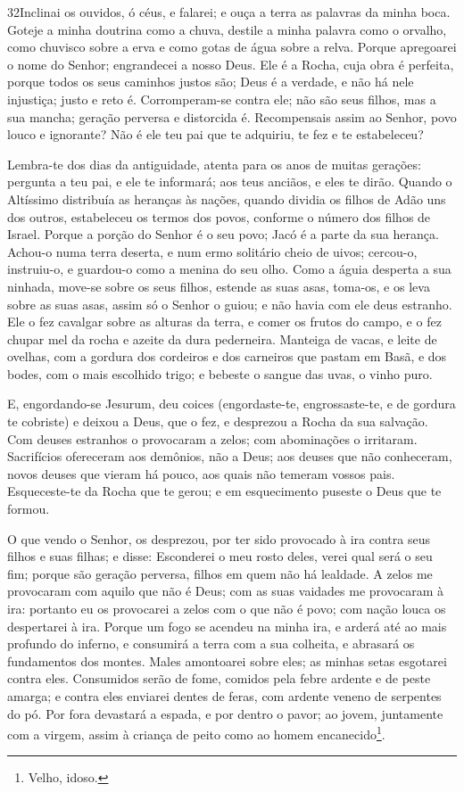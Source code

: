 \medskip

\lettrine{32} Inclinai os ouvidos, ó céus, e falarei; e ouça a
terra as palavras da minha boca. Goteje a minha doutrina como a
chuva, destile a minha palavra como o orvalho, como chuvisco sobre a
erva e como gotas de água sobre a relva. Porque apregoarei o
nome do Senhor; engrandecei a nosso Deus. Ele é a Rocha, cuja
obra é perfeita, porque todos os seus caminhos justos são; Deus é a
verdade, e não há nele injustiça; justo e reto é. Corromperam-se
contra ele; não são seus filhos, mas a sua mancha; geração perversa
e distorcida é. Recompensais assim ao Senhor, povo louco e
ignorante? Não é ele teu pai que te adquiriu, te fez e te
estabeleceu?

Lembra-te dos dias da antiguidade, atenta para os anos de muitas
gerações: pergunta a teu pai, e ele te informará; aos teus anciãos,
e eles te dirão. Quando o Altíssimo distribuía as heranças às
nações, quando dividia os filhos de Adão uns dos outros, estabeleceu
os termos dos povos, conforme o número dos filhos de Israel.
Porque a porção do Senhor é o seu povo; Jacó é a parte da sua
herança. Achou-o numa terra deserta, e num ermo solitário
cheio de uivos; cercou-o, instruiu-o, e guardou-o como a menina do
seu olho. Como a águia desperta a sua ninhada, move-se sobre
os seus filhos, estende as suas asas, toma-os, e os leva sobre as
suas asas, assim só o Senhor o guiou; e não havia com ele
deus estranho. Ele o fez cavalgar sobre as alturas da terra,
e comer os frutos do campo, e o fez chupar mel da rocha e azeite da
dura pederneira. Manteiga de vacas, e leite de ovelhas, com a
gordura dos cordeiros e dos carneiros que pastam em Basã, e dos
bodes, com o mais escolhido trigo; e bebeste o sangue das uvas, o
vinho puro.

E, engordando-se Jesurum, deu coices (engordaste-te,
engrossaste-te, e de gordura te cobriste) e deixou a Deus, que o
fez, e desprezou a Rocha da sua salvação. Com deuses
estranhos o provocaram a zelos; com abominações o irritaram.
Sacrifícios ofereceram aos demônios, não a Deus; aos deuses
que não conheceram, novos deuses que vieram há pouco, aos quais não
temeram vossos pais. Esqueceste-te da Rocha que te gerou; e
em esquecimento puseste o Deus que te formou.

O que vendo o Senhor, os desprezou, por ter sido provocado à ira
contra seus filhos e suas filhas; e disse: Esconderei o meu
rosto deles, verei qual será o seu fim; porque são geração perversa,
filhos em quem não há lealdade. A zelos me provocaram com
aquilo que não é Deus; com as suas vaidades me provocaram à ira:
portanto eu os provocarei a zelos com o que não é povo; com nação
louca os despertarei à ira. Porque um fogo se acendeu na
minha ira, e arderá até ao mais profundo do inferno, e consumirá a
terra com a sua colheita, e abrasará os fundamentos dos montes.
Males amontoarei sobre eles; as minhas setas esgotarei contra
eles. Consumidos serão de fome, comidos pela febre ardente e
de peste amarga; e contra eles enviarei dentes de feras, com ardente
veneno de serpentes do pó. Por fora devastará a espada, e por
dentro o pavor; ao jovem, juntamente com a virgem, assim à criança
de peito como ao homem encanecido\footnote{Velho, idoso.}.

